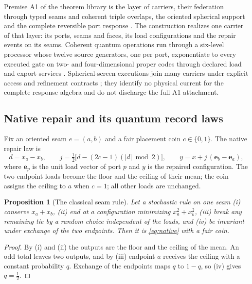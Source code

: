 \documentclass[11pt]{article}
\newtheorem{proposition}[theorem]{Proposition}
\theoremstyle{definition}
\theoremstyle{remark}
\theoremstyle{plain}
\begin{document}
Premise A1 of the theorem library is the layer of carriers, their federation
through typed seams and coherent triple overlaps, the oriented spherical
support and the complete reversible port response \cite{axref}. The
construction realizes one carrier of that layer: its ports, seams and faces,
its load configurations and the repair events on its seams. Coherent quantum
operations run through a six-level processor whose twelve source generators,
one per port, exponentiate to every executed gate on two- and
four-dimensional proper codes through declared load and export services
\cite{csDERIV,ssREADME}. Spherical-screen executions join many carriers under
explicit access and refinement contracts \cite{nativeContinuum}; they
identify no physical current for the complete response algebra and do not
discharge the full A1 attachment.

\subsection{Native repair and its quantum record laws}
\label{sec:repair}

Fix an oriented seam $e=(a,b)$ and a fair placement coin $c\in\{0,1\}$. The
native repair law is
\begin{equation}
\label{eq:native}
d=x_a-x_b,\qquad
j=\tfrac12\bigl[d-(2c-1)(\lvert d\rvert \bmod 2)\bigr],\qquad
y=x+j\,(\mathbf e_b-\mathbf e_a),
\end{equation}
where $\mathbf e_p$ is the unit load vector of port $p$ and $y$ is the
repaired configuration. The two endpoint loads become the floor and the
ceiling of their mean; the coin assigns the ceiling to $a$ when $c=1$; all
other loads are unchanged.

\begin{proposition}[The classical seam rule]
\label{prop:classical-rule}
Let a stochastic rule on one seam (i) conserve $x_a+x_b$, (ii) end at a
configuration minimizing $x_a^2+x_b^2$, (iii) break any remaining tie by a
random choice independent of the loads, and (iv) be invariant under exchange
of the two endpoints. Then it is \eqref{eq:native} with a fair coin.
\end{proposition}

\begin{proof}
By (i) and (ii) the outputs are the floor and the ceiling of the mean. An odd
total leaves two outputs, and by (iii) endpoint $a$ receives the ceiling with
a constant probability $q$. Exchange of the endpoints maps $q$ to $1-q$, so
(iv) gives $q=\tfrac12$.
\end{proof}
\end{document}
